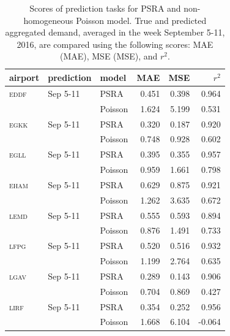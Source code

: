 \documentclass[draft,review]{elsarticle}
\newcommand{\airp}[1]{\textcolor{#1}{\textsc{#1}}}
\begin{document}
\begin{table}
  \centering
  \caption{Scores of prediction tasks for \acs{PSRA} and non-homogeneous Poisson model. True and predicted aggregated demand, averaged in the week September 5-11, 2016, are compared using the following scores: \acl{MAE} (\acs{MAE}), \acl{MSE} (\acs{MSE}), and \(r^2\).}
  \label{tab:predictions_last_week}
  \begin{tabular}{lllrrr}
    \toprule
    airport    & prediction & model & \acs{MAE} & \acs{MSE} & \(r^2\)  \\
    \midrule
    \airp{eddf} & Sep 5-11  & \acs{PSRA} &  0.451 &   0.398 &  0.964 \\
         &                  & Poisson    &  1.624 &   5.199 &  0.531 \\
    \airp{egkk} & Sep 5-11  & \acs{PSRA} &  0.320 &   0.187 &  0.920 \\
         &                  & Poisson    &  0.748 &   0.928 &  0.602 \\
    \airp{egll} & Sep 5-11  & \acs{PSRA} &  0.395 &   0.355 &  0.957 \\
         &                  & Poisson    &  0.959 &   1.661 &  0.798 \\
    \airp{eham} & Sep 5-11  & \acs{PSRA} &  0.629 &   0.875 &  0.921 \\
         &                  & Poisson    &  1.262 &   3.635 &  0.672 \\
    \airp{lemd} & Sep 5-11  & \acs{PSRA} &  0.555 &   0.593 &  0.894 \\
         &                  & Poisson    &  0.876 &   1.491 &  0.733 \\
    \airp{lfpg} & Sep 5-11  & \acs{PSRA} &  0.520 &   0.516 &  0.932 \\
         &                  & Poisson    &  1.199 &   2.764 &  0.635 \\
    \airp{lgav} & Sep 5-11  & \acs{PSRA} &  0.289 &   0.143 &  0.906 \\
         &                  & Poisson    &  0.704 &   0.869 &  0.427 \\
    \airp{lirf} & Sep 5-11  & \acs{PSRA} &  0.354 &   0.252 &  0.956 \\
         &                  & Poisson    &  1.668 &   6.104 & -0.064 \\
    \bottomrule
  \end{tabular}
\end{table}
\end{document}
